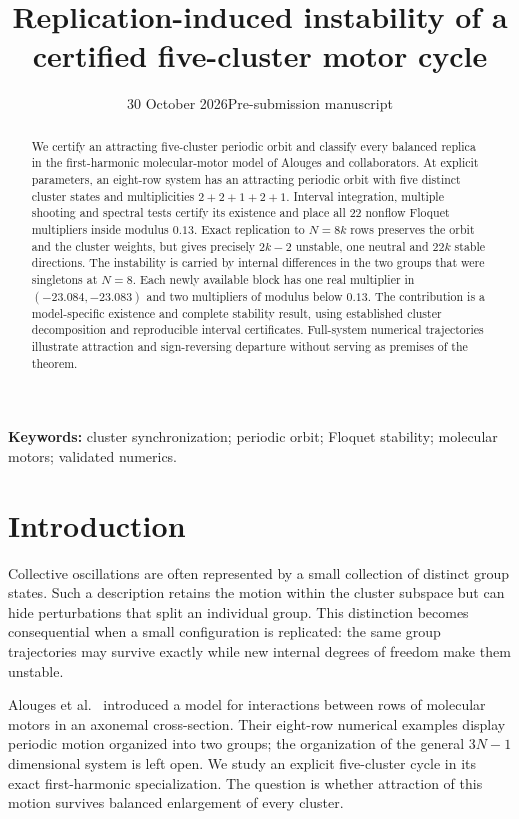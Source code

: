 \documentclass[11pt]{article}
\title{\color{ink}Replication-induced instability of a\\certified five-cluster motor cycle}
\author{}
\date{30 October 2026\quad\textbullet\quad Pre-submission manuscript}
\begin{document}
\maketitle
\vspace{-1.5em}
\begin{abstract}
We certify an attracting five-cluster periodic orbit and classify every
balanced replica in the first-harmonic molecular-motor model of Alouges and
collaborators. At explicit
parameters, an eight-row system has an attracting periodic orbit with five
distinct cluster states and multiplicities $2+2+1+2+1$. Interval integration,
multiple shooting and spectral tests certify its existence and place all
22 nonflow Floquet multipliers inside modulus $0.13$. Exact replication to
$N=8k$ rows preserves the orbit and the cluster weights, but gives precisely
$2k-2$ unstable, one neutral and $22k$ stable directions. The instability is
carried by internal differences in the two groups that were singletons at
$N=8$. Each newly available block has one real multiplier in
$(-23.084,-23.083)$ and two multipliers of modulus below $0.13$.
The contribution is a model-specific existence and complete stability result,
using established cluster decomposition and reproducible interval certificates.
Full-system numerical trajectories illustrate attraction and
sign-reversing departure without serving as premises of the theorem.
\end{abstract}
\noindent\textbf{Keywords:} cluster synchronization; periodic orbit;
Floquet stability; molecular motors; validated numerics.

\section{Introduction}
Collective oscillations are often represented by a small collection of
distinct group states. Such a description retains the motion within the
cluster subspace but can hide perturbations that split an individual group.
This distinction becomes consequential when a small configuration is
replicated: the same group trajectories may survive exactly while new
internal degrees of freedom make them unstable.

Alouges et al.~\cite{alouges} introduced a model for interactions between
rows of molecular motors in an axonemal cross-section. Their eight-row
numerical examples display periodic motion organized into two groups;
the organization of the general $3N-1$ dimensional system is left open.
We study an explicit five-cluster cycle in its exact first-harmonic
specialization. The question is whether attraction of this motion survives
balanced enlargement of every cluster.
\end{document}
